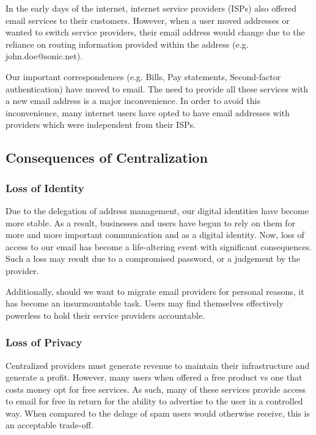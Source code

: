 \documentclass{article}
\begin{document}
In the early days of the internet, internet service providers (ISPs) also offered email services to their customers. However, when a user moved addresses or wanted to switch service providers, their email address would change due to the reliance on routing information provided within the address (e.g. john.doe@sonic.net). 

Our important correspondences (e.g. Bills, Pay statements, Second-factor authentication) have moved to email. The need to provide all these services with a new email address is a major inconvenience. In order to avoid this inconvenience, many internet users have opted to have email addresses with providers which were independent from their ISPs.

\subsection{Consequences of Centralization}


\subsubsection{Loss of Identity}

Due to the delegation of address management, our digital identities have become more stable. As a result, businesses and users have begun to rely on them for more and more important communication and as a digital identity. Now, loss of access to our email has become a life-altering event with significant consequences. Such a loss may result due to a compromised password, or a judgement by the provider. 

Additionally, should we want to migrate email providers for personal reasons, it has become an insurmountable task. Users may find themselves effectively powerless to hold their service providers accountable.

\subsubsection{Loss of Privacy}

Centralized providers must generate revenue to maintain their infrastructure and generate a profit. However, many users when offered a free product vs one that costs money opt for free services. As such, many of these services provide access to email for free in return for the ability to advertise to the user in a controlled way. When compared to the deluge of spam users would otherwise receive, this is an acceptable trade-off.
\end{document}

